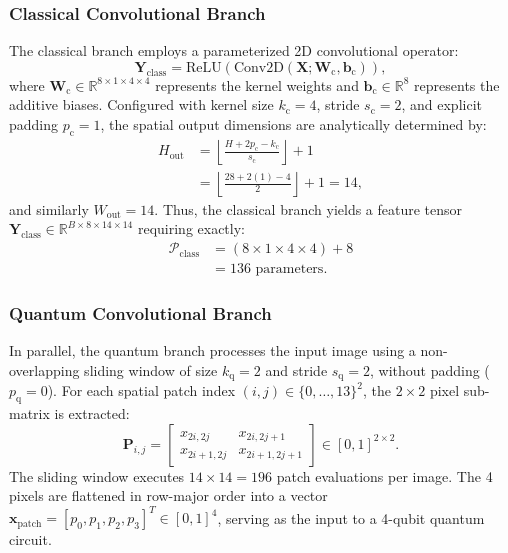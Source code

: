 \documentclass[journal]{IEEEtran}
\begin{document}
\subsubsection{Classical Convolutional Branch}
The classical branch employs a parameterized 2D convolutional operator:
\begin{equation}
\mathbf{Y}_{\mathrm{class}} = \mathrm{ReLU}\left( \mathrm{Conv2D}(\mathbf{X}; \mathbf{W}_{\mathrm{c}}, \mathbf{b}_{\mathrm{c}}) \right),
\label{eq:classical_branch}
\end{equation}
where $\mathbf{W}_{\mathrm{c}} \in \mathbb{R}^{8 \times 1 \times 4 \times 4}$ represents the kernel weights and $\mathbf{b}_{\mathrm{c}} \in \mathbb{R}^8$ represents the additive biases. Configured with kernel size $k_{\mathrm{c}} = 4$, stride $s_{\mathrm{c}} = 2$, and explicit padding $p_{\mathrm{c}} = 1$, the spatial output dimensions are analytically determined by:
\begin{align}
H_{\mathrm{out}} &= \left\lfloor \frac{H + 2p_{\mathrm{c}} - k_{\mathrm{c}}}{s_{\mathrm{c}}} \right\rfloor + 1 \nonumber \\
&= \left\lfloor \frac{28 + 2(1) - 4}{2} \right\rfloor + 1 = 14,
\label{eq:spatial_dim_derivation}
\end{align}
and similarly $W_{\mathrm{out}} = 14$. Thus, the classical branch yields a feature tensor $\mathbf{Y}_{\mathrm{class}} \in \mathbb{R}^{B \times 8 \times 14 \times 14}$ requiring exactly:
\begin{align}
\mathcal{P}_{\mathrm{class}} &= (8 \times 1 \times 4 \times 4) + 8 \nonumber \\
&= 136 \text{ parameters}.
\label{eq:param_classical}
\end{align}

\subsubsection{Quantum Convolutional Branch}
In parallel, the quantum branch processes the input image using a non-overlapping sliding window of size $k_{\mathrm{q}} = 2$ and stride $s_{\mathrm{q}} = 2$, without padding ($p_{\mathrm{q}} = 0$). For each spatial patch index $(i, j) \in \{0, \dots, 13\}^2$, the $2 \times 2$ pixel sub-matrix is extracted:
\begin{equation}
\mathbf{P}_{i,j} = \begin{bmatrix} x_{2i, 2j} & x_{2i, 2j+1} \\ x_{2i+1, 2j} & x_{2i+1, 2j+1} \end{bmatrix} \in [0, 1]^{2 \times 2}.
\label{eq:patch_extraction}
\end{equation}
The sliding window executes $14 \times 14 = 196$ patch evaluations per image. The 4 pixels are flattened in row-major order into a vector $\mathbf{x}_{\mathrm{patch}} = [p_0, p_1, p_2, p_3]^T \in [0, 1]^4$, serving as the input to a 4-qubit quantum circuit.
\end{document}
